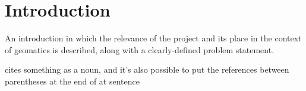 \chapter{Introduction}
An introduction in which the relevance of the project and its place in the context of geomatics is described, along with a clearly-defined problem statement.

\citet{Dominici2017} cites something as a noun, and it's also possible to put the references between parentheses at the end of at sentence~\citep{Montgomery2016}
